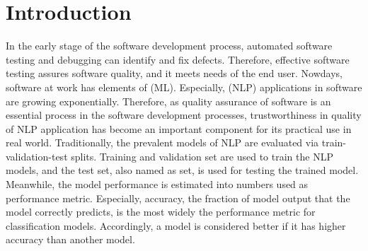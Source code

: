 \section{Introduction}
\label{sec:intro}








In the early stage of the software development process, automated
software testing and debugging can identify and fix
defects. Therefore, effective software testing assures software
quality, and it meets needs of the end user. Nowdays, software at work
has elements of \ml (ML). Especially, \Nlp (NLP) applications in
software are growing exponentially. Therefore, as quality assurance of
software is an essential process in the software development
processes, trustworthiness in quality of NLP application has become an
important component for its practical use in real world.
Traditionally, the prevalent models of NLP are evaluated via
train-validation-test splits. Training and validation set are used to
train the NLP models, and the test set, also named as \ho set, is used
for testing the trained model. Meanwhile, the model performance is
estimated into numbers used as performance metric. Especially,
accuracy, the fraction of model output that the model correctly
predicts, is the most widely the performance metric for classification
models. Accordingly, a model is considered better if it has higher
accuracy than another model.

